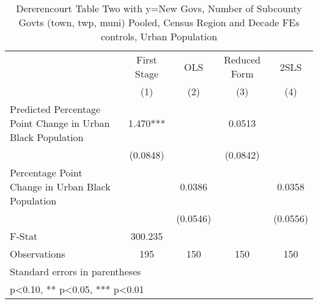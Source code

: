 \begin{table}[htbp]\centering
\def\sym#1{\ifmmode^{#1}\else\(^{#1}\)\fi}
\caption{Dererencourt Table Two with y=New Govs, Number of Subcounty Govts (town, twp, muni)  Pooled, Census Region and Decade FEs controls, Urban Population}
\begin{tabular}{l*{4}{c}}
\toprule
                    & First Stage   &         OLS   &Reduced Form   &        2SLS   \\
                    &\multicolumn{1}{c}{(1)}   &\multicolumn{1}{c}{(2)}   &\multicolumn{1}{c}{(3)}   &\multicolumn{1}{c}{(4)}   \\
\midrule
Predicted Percentage Point Change in Urban Black Population&       1.470***&               &      0.0513   &               \\
                    &    (0.0848)   &               &    (0.0842)   &               \\
\addlinespace
Percentage Point Change in Urban Black Population&               &      0.0386   &               &      0.0358   \\
                    &               &    (0.0546)   &               &    (0.0556)   \\
\midrule
F-Stat              &     300.235   &               &               &               \\
Observations        &         195   &         150   &         150   &         150   \\
\bottomrule
\multicolumn{5}{l}{\footnotesize Standard errors in parentheses}\\
\multicolumn{5}{l}{\footnotesize * p<0.10, ** p<0.05, *** p<0.01}\\
\end{tabular}
\end{table}

